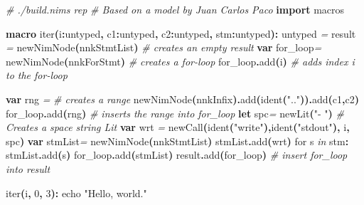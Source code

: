 \documentclass[
  12pt,
]{book}
\newenvironment{Shaded}{}{}
\newcommand{\CommentTok}[1]{\textcolor[rgb]{0.38,0.63,0.69}{\textit{#1}}}
\newcommand{\DataTypeTok}[1]{\textcolor[rgb]{0.56,0.13,0.00}{#1}}
\newcommand{\DecValTok}[1]{\textcolor[rgb]{0.25,0.63,0.44}{#1}}
\newcommand{\KeywordTok}[1]{\textcolor[rgb]{0.00,0.44,0.13}{\textbf{#1}}}
\newcommand{\NormalTok}[1]{#1}
\newcommand{\OtherTok}[1]{\textcolor[rgb]{0.00,0.44,0.13}{#1}}
\newcommand{\StringTok}[1]{\textcolor[rgb]{0.25,0.44,0.63}{#1}}
\begin{document}
\begin{Shaded}
\begin{Highlighting}[]
\CommentTok{\# ./build.nims rep}
\CommentTok{\# Based on a model by Juan Carlos Paco}
\KeywordTok{import}\NormalTok{ macros}

\KeywordTok{macro }\StringTok{iter}\KeywordTok{(}\NormalTok{i}\KeywordTok{:}\DataTypeTok{untyped}\KeywordTok{,}\NormalTok{ c1}\KeywordTok{:}\DataTypeTok{untyped}\KeywordTok{,}
\NormalTok{            c2}\KeywordTok{:}\DataTypeTok{untyped}\KeywordTok{,}\NormalTok{ stm}\KeywordTok{:}\DataTypeTok{untyped}\KeywordTok{):} \DataTypeTok{untyped} \CommentTok{=}
  \OtherTok{result} \CommentTok{=} \DataTypeTok{newNimNode}\KeywordTok{(}\NormalTok{nnkStmtList}\KeywordTok{)}  \CommentTok{\# creates an empty result}
  \KeywordTok{var}\NormalTok{ for\_loop}\CommentTok{=}
    \DataTypeTok{newNimNode}\KeywordTok{(}\NormalTok{nnkForStmt}\KeywordTok{)} \CommentTok{\# creates a for{-}loop}
\NormalTok{  for\_loop}\KeywordTok{.}\DataTypeTok{add}\KeywordTok{(}\NormalTok{i}\KeywordTok{)} \CommentTok{\# adds index \textasciigrave{}i\textasciigrave{} to the for{-}loop}

  \KeywordTok{var}\NormalTok{ rng }\CommentTok{=} \CommentTok{\# creates a range}
    \DataTypeTok{newNimNode}\KeywordTok{(}\NormalTok{nnkInfix}\KeywordTok{).}\DataTypeTok{add}\KeywordTok{(}\DataTypeTok{ident}\KeywordTok{(}\StringTok{".."}\KeywordTok{)).}\DataTypeTok{add}\KeywordTok{(}\NormalTok{c1}\KeywordTok{,}\NormalTok{c2}\KeywordTok{)}
\NormalTok{  for\_loop}\KeywordTok{.}\DataTypeTok{add}\KeywordTok{(}\NormalTok{rng}\KeywordTok{)}  \CommentTok{\# inserts the range into for\_loop}
  \KeywordTok{let}\NormalTok{ spc}\CommentTok{=} \DataTypeTok{newLit}\KeywordTok{(}\StringTok{"{-} "}\KeywordTok{)} \CommentTok{\# Creates a space string Lit}
  \KeywordTok{var}\NormalTok{ wrt }\CommentTok{=} \DataTypeTok{newCall}\KeywordTok{(}\DataTypeTok{ident}\KeywordTok{(}\StringTok{"write"}\KeywordTok{),}\DataTypeTok{ident}\KeywordTok{(}\StringTok{"stdout"}\KeywordTok{),}\NormalTok{ i}\KeywordTok{,}\NormalTok{ spc}\KeywordTok{)}
  \KeywordTok{var}\NormalTok{ stmList}\CommentTok{=} \DataTypeTok{newNimNode}\KeywordTok{(}\NormalTok{nnkStmtList}\KeywordTok{)}
\NormalTok{  stmList}\KeywordTok{.}\DataTypeTok{add}\KeywordTok{(}\NormalTok{wrt}\KeywordTok{)}
  \DataTypeTok{for}\NormalTok{ s }\CommentTok{in}\NormalTok{ stm}\KeywordTok{:}\NormalTok{ stmList}\KeywordTok{.}\DataTypeTok{add}\KeywordTok{(}\NormalTok{s}\KeywordTok{)}
\NormalTok{  for\_loop}\KeywordTok{.}\DataTypeTok{add}\KeywordTok{(}\NormalTok{stmList}\KeywordTok{)}
  \OtherTok{result}\KeywordTok{.}\DataTypeTok{add}\KeywordTok{(}\NormalTok{for\_loop}\KeywordTok{)} \CommentTok{\# insert for\_loop into result}

\DataTypeTok{iter}\KeywordTok{(}\NormalTok{i}\KeywordTok{,} \DecValTok{0}\KeywordTok{,} \DecValTok{3}\KeywordTok{):}
  \DataTypeTok{echo} \StringTok{"Hello, world."}
\end{Highlighting}
\end{Shaded}
\end{document}
